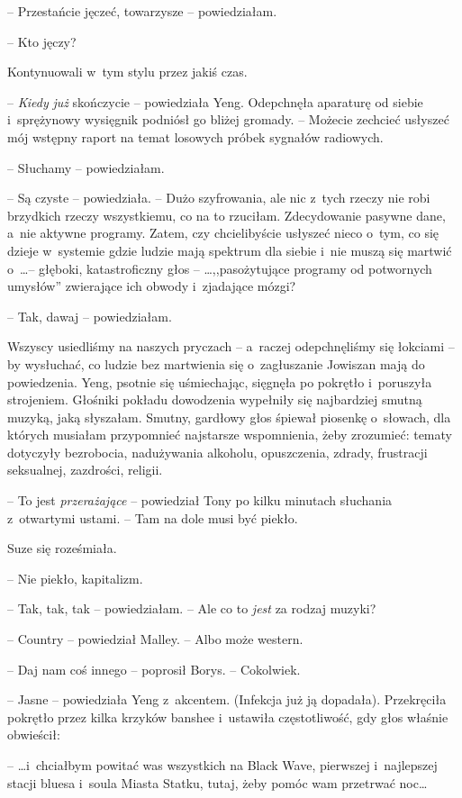 \documentclass[oneside,polish,11pt,sfheadings]{mwbk}
\begin{document}
-- Przestańcie jęczeć, towarzysze -- powiedziałam.

-- Kto jęczy?

Kontynuowali w~tym stylu przez jakiś czas.

-- \textit{Kiedy} \textit{już} skończycie -- powiedziała Yeng. Odepchnęła
aparaturę od siebie i~sprężynowy wysięgnik podniósł go bliżej gromady. -- Możecie zechcieć usłyszeć mój wstępny raport na temat losowych próbek
sygnałów radiowych.

-- Słuchamy -- powiedziałam.

-- Są czyste -- powiedziała. -- Dużo szyfrowania, ale nic z~tych rzeczy nie
robi brzydkich rzeczy wszystkiemu, co na to rzuciłam. Zdecydowanie
pasywne dane, a~nie aktywne programy. Zatem, czy chcielibyście usłyszeć
nieco o~tym, co się dzieje w~systemie gdzie ludzie mają spektrum dla
siebie i~nie muszą się martwić o~\ldots  -- głęboki, katastroficzny głos -- \ldots  ,,pasożytujące programy od potwornych umysłów'' zwierające ich
obwody i~zjadające mózgi?

-- Tak, dawaj -- powiedziałam.

Wszyscy usiedliśmy na naszych pryczach -- a~raczej odepchnęliśmy się
łokciami -- by wysłuchać, co ludzie bez martwienia się o~zagłuszanie
Jowiszan mają do powiedzenia. Yeng, psotnie się uśmiechając, sięgnęła po
pokrętło i~poruszyła strojeniem. Głośniki pokładu dowodzenia wypełniły
się najbardziej smutną muzyką, jaką słyszałam. Smutny, gardłowy głos
śpiewał piosenkę o~słowach, dla których musiałam przypomnieć najstarsze
wspomnienia, żeby zrozumieć: tematy dotyczyły bezrobocia, nadużywania
alkoholu, opuszczenia, zdrady, frustracji seksualnej, zazdrości,
religii.

-- To jest \textit{przerażające} -- powiedział Tony po kilku minutach
słuchania z~otwartymi ustami. -- Tam na dole musi być piekło.

Suze się roześmiała. 

-- Nie piekło, kapitalizm.

-- Tak, tak, tak -- powiedziałam. -- Ale co to \textit{jest }za rodzaj
muzyki?

-- Country -- powiedział Malley. -- Albo może western.

-- Daj nam coś innego -- poprosił Borys. -- Cokolwiek.

-- Jasne -- powiedziała Yeng z~akcentem. (Infekcja już ją dopadała).
Przekręciła pokrętło przez kilka krzyków banshee i~ustawiła
częstotliwość, gdy głos właśnie obwieścił: 

-- \ldots  i~chciałbym powitać was
wszystkich na Black Wave, pierwszej i~najlepszej stacji bluesa i~soula
Miasta Statku, tutaj, żeby pomóc wam przetrwać noc\ldots 
\end{document}

